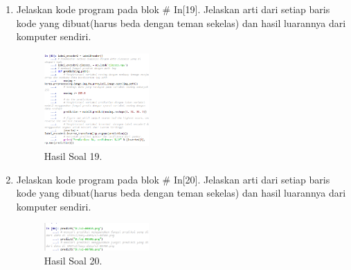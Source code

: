 \begin{enumerate}
    \item Jelaskan kode program pada blok \# In[19]. Jelaskan arti dari setiap baris kode yang dibuat(harus beda dengan teman sekelas) dan hasil luarannya dari komputer sendiri.
    \hfill\break
    
    \begin{figure}[H]
        \centering
            \includegraphics[width=4cm]{figures/1174096/tugas7/praktek_19.PNG}
            \caption{Hasil Soal 19.}
        \end{figure}
        
    \item Jelaskan kode program pada blok \# In[20]. Jelaskan arti dari setiap baris kode yang dibuat(harus beda dengan teman sekelas) dan hasil luarannya dari komputer sendiri.
    \hfill\break
    
    \begin{figure}[H]
        \centering
            \includegraphics[width=4cm]{figures/1174096/tugas7/praktek_20.PNG}
            \caption{Hasil Soal 20.}
        \end{figure}
        
\end{enumerate}

